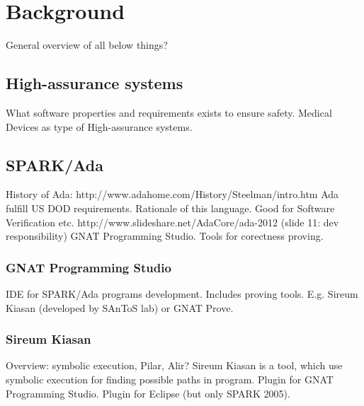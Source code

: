 
\cleardoublepage


\chapter{Background}
\label{background}

General overview of all below things?

\section{High-assurance systems}
\label{background:highas}
What software properties and requirements exists to ensure safety.
Medical Devices as type of High-assurance systems.


\section{SPARK/Ada}
\label{background:spark}
History of Ada: http://www.adahome.com/History/Steelman/intro.htm 
Ada fulfill US DOD requirements.
Rationale of this language. Good for Software Verification etc.
http://www.slideshare.net/AdaCore/ada-2012 (slide 11: dev responsibility)
GNAT Programming Studio.
Tools for corectness proving.

\subsection{GNAT Programming Studio}
\label{background:spark:gps}
IDE for SPARK/Ada programs development. Includes proving tools. E.g. Sireum Kiasan (developed by SAnToS lab) or GNAT Prove.

\subsection{Sireum Kiasan}
\label{background:spark:sireum}
Overview: symbolic execution, Pilar, Alir\cite{THB}?
Sireum Kiasan\cite{DLR} is a tool, which use symbolic execution for finding possible paths in program.
Plugin for GNAT Programming Studio.
Plugin for Eclipse (but only SPARK 2005).

